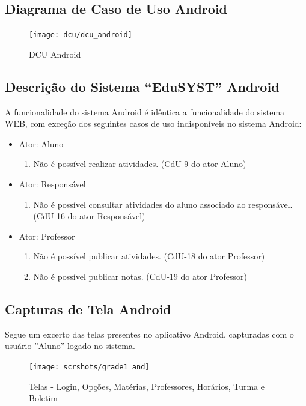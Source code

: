 \documentclass[main.tex]{subfiles}
\begin{document}
\subsection{Diagrama de Caso de Uso Android}
\begin{figure}[H]
    \centering
    \texttt{[image: dcu/dcu\_android]}
    \caption{DCU Android}
\end{figure}

\subsection{Descrição do Sistema ``EduSYST'' Android}
A funcionalidade do sistema Android é idêntica a funcionalidade do sistema WEB, com exceção dos seguintes casos de uso indisponíveis no sistema Android:

\begin{itemize}
    \item Ator: Aluno
    \begin{enumerate}
        \item Não é possível realizar atividades. (CdU-9 do ator Aluno)
    \end{enumerate}

    \item Ator: Responsável
    \begin{enumerate}
        \item Não é possível consultar atividades do aluno associado ao responsável. (CdU-16 do ator Responsável)
    \end{enumerate}

    \item Ator: Professor
    \begin{enumerate}
        \item Não é possível publicar atividades. (CdU-18 do ator Professor)
        \item Não é possível publicar notas. (CdU-19 do ator Professor)
    \end{enumerate}
\end{itemize}

\newpage
\subsection{Capturas de Tela Android}
Segue um excerto das telas presentes no aplicativo Android, capturadas com o usuário ''Aluno'' logado no sistema.
\begin{figure}[H]
    \centering
    \hspace*{-1.1cm} %
    \centering
    \texttt{[image: scrshots/grade1\_and]}
    \caption{Telas - Login, Opções, Matérias, Professores, Horários, Turma e Boletim}
\end{figure}
\end{document}
